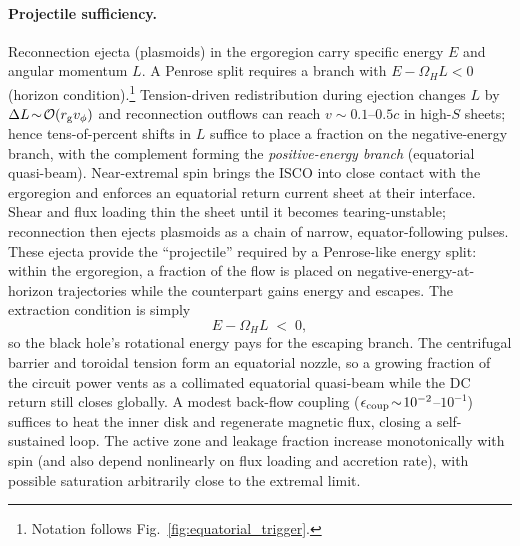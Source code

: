\documentclass[twocolumn]{aastex701}
\begin{document}
\paragraph{Projectile sufficiency.}
Reconnection ejecta (plasmoids) in the ergoregion carry specific energy $E$ and angular momentum $L$. A Penrose split requires a branch with $E-\Omega_H L<0$ (horizon condition).\footnote{Notation follows Fig.~\ref{fig:equatorial_trigger}.}
Tension-driven redistribution during ejection changes $L$ by $\Delta L\!\sim\!\mathcal{O}(r_{\rm g}v_\phi)$ and reconnection outflows can reach $v\!\sim\!0.1$–$0.5c$ in high-$S$ sheets; hence tens-of-percent shifts in $L$ suffice to place a fraction on the negative-energy branch, with the complement forming the \emph{positive-energy branch} (equatorial quasi-beam).
Near-extremal spin brings the ISCO into close contact with the ergoregion and enforces an equatorial return current sheet at their interface. Shear and flux loading thin the sheet until it becomes tearing-unstable; reconnection then ejects plasmoids as a chain of narrow, equator-following pulses. These ejecta provide the “projectile” required by a Penrose-like energy split: within the ergoregion, a fraction of the flow is placed on negative-energy-at-horizon trajectories while the counterpart gains energy and escapes. The extraction condition is simply
\begin{equation}
E - \Omega_H L \;<\; 0, \label{eq:penrose-cond}
\end{equation}
so the black hole’s rotational energy pays for the escaping branch. The centrifugal barrier and toroidal tension form an equatorial nozzle, so a growing fraction of the circuit power vents as a collimated equatorial quasi-beam while the DC return still closes globally. A modest back-flow coupling ($\epsilon_{\rm coup}\!\sim\!10^{-2}$–$10^{-1}$) suffices to heat the inner disk and regenerate magnetic flux, closing a self-sustained loop. The active zone and leakage fraction increase monotonically with spin (and also depend nonlinearly on flux loading and accretion rate), with possible saturation arbitrarily close to the extremal limit.
\end{document}

